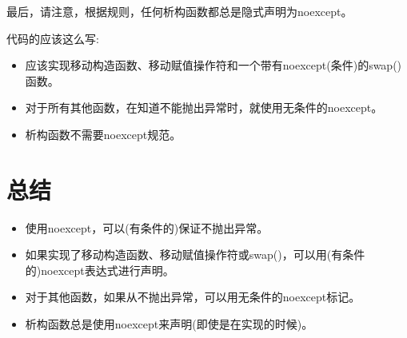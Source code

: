 最后，请注意，根据规则，任何析构函数都总是隐式声明为noexcept。\par

代码的应该这么写:\par

\begin{itemize}
  \item 应该实现移动构造函数、移动赋值操作符和一个带有noexcept(条件)的swap()函数。
  \item 对于所有其他函数，在知道不能抛出异常时，就使用无条件的noexcept。
  \item 析构函数不需要noexcept规范。
\end{itemize}


\section{总结}

\begin{itemize}
  \item 使用noexcept，可以(有条件的)保证不抛出异常。
  \item 如果实现了移动构造函数、移动赋值操作符或swap()，可以用(有条件的)noexcept表达式进行声明。
  \item 对于其他函数，如果从不抛出异常，可以用无条件的noexcept标记。
  \item 析构函数总是使用noexcept来声明(即使是在实现的时候)。
\end{itemize}
